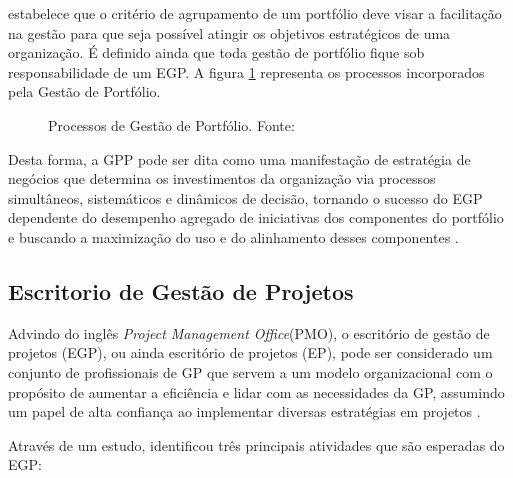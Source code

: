   estabelece que o critério de agrupamento de um portfólio deve visar a facilitação na gestão para que seja possível atingir os objetivos estratégicos de uma organização. É definido ainda que toda gestão de portfólio fique sob responsabilidade de um EGP. A figura \ref{estrategia_portfolio} representa os processos incorporados pela Gestão de Portfólio.

  \begin{figure}[ht]
    \centering
    \caption{Processos de Gestão de Portfólio. Fonte: \cite{pmi2006}}
    \label{estrategia_portfolio}
  \end{figure}

  Desta forma, a GPP pode ser dita como uma manifestação de estratégia de negócios que determina os investimentos da organização via processos simultâneos, sistemáticos e dinâmicos de decisão, tornando o sucesso do EGP dependente do desempenho agregado de iniciativas dos componentes do portfólio e buscando a maximização do uso e do alinhamento desses componentes \cite{pmiguide2014}.

\subsection{Escritorio de Gestão de Projetos}

  Advindo do inglês \textit{Project Management Office}(PMO), o escritório de gestão de projetos (EGP), ou ainda escritório de projetos (EP), pode ser considerado um conjunto de profissionais de GP que servem a um modelo organizacional com o propósito de aumentar a eficiência e lidar com as necessidades da GP, assumindo um papel de alta confiança ao implementar diversas estratégias em projetos \cite{kendall2003advanced}.

  Através de um estudo,  identificou três principais atividades que são esperadas do EGP:

